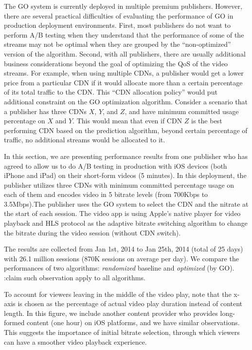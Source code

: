The GO system is currently deployed in multiple premium publishers. However, there are several practical difficulties of evaluating the performance of GO in production deployment environments.  First, most publishers do not want to perform A/B testing when they understand that the performance of some of the streams may not be optimal when they are grouped by the “non-optimized” version of the algorithm. Second, with all publishers, there are usually additional business considerations beyond the goal of optimizing the QoS of the video streams. For example, when using multiple CDNs, a publisher would get a lower price from a particular CDN if it would allocate more than a certain percentage of its total traffic to the CDN.  This “CDN allocation policy” would put additional constraint on the GO optimization algorithm.  Consider a scenario that a publisher has three CDNs $X$, $Y$, and $Z$, and have minimum committed usage percentage on $X$ and $Y$. This would mean that even if CDN $Z$ is the best performing CDN based on the prediction algorithm, beyond certain percentage of traffic, no additional streams would be allocated to it. 

In this section, we are presenting performance results from one publisher who has agreed to allow us to do A/B testing in production with iOS devices (both iPhone and iPad) on their short-form videos (5 minutes).  In this deployment, the publisher utilizes three CDNs with minimum committed percentage usage on each of them and encodes video in 5 bitrate levels (from 700Kbps to 3.5Mbps).The publisher uses the GO system to select the CDN and the nitrate at the start of each session.  The video app is using Apple’s native player for video playback and  HLS protocol as the adaptive 
bitrate switching algorithm to change the bitrate during the video session (without CDN switch). 
 
The results are collected from Jan 1st, 2014 to Jan 25th, 2014 (total of 25 days) with 26.1 million sessions (870K sessions on average per day).
We compare the performances of two algorithms: {\it randomized} baseline and {\it optimized} (by GO).
:claim such observation apply to all algorithms.

To account for viewers leaving in the middle of the video play, note that the x-axis is chosen as the percentage of actual 
video play duration instead of content length. 
In this figure, we include another content provider who provides long-formed content (one hour) on iOS platforms, and we have similar observations. This suggests the importance of initial bitrate selection, through which viewers can have a smoother video playback experience.

